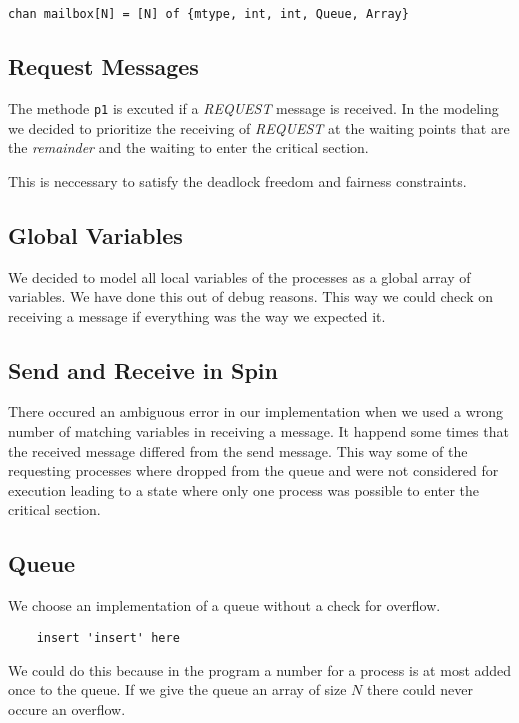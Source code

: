 \documentclass{llncs}
\begin{document}
\begin{lstlisting}
chan mailbox[N] = [N] of {mtype, int, int, Queue, Array}
\end{lstlisting}

\subsection{Request Messages}

The methode \lstinline|p1| is excuted if a \emph{REQUEST} message is received.
In the modeling we decided to prioritize the receiving of \emph{REQUEST} at the
waiting points that are the \emph{remainder} and the waiting to enter the critical section.

This is neccessary to satisfy the deadlock freedom and fairness constraints.

\subsection{Global Variables}

We decided to model all local variables of the processes as a global array of variables.
We have done this out of debug reasons. This way we could check on receiving a message
if everything was the way we expected it.

\subsection{Send and Receive in Spin}

There occured an ambiguous error in our implementation when we used a wrong number of matching
variables in receiving a message. It happend some times that the received message differed from the
send message. This way some of the requesting processes where dropped from the queue and were not considered
for execution leading to a state where only one process was possible to enter the critical section.

\subsection{Queue}

We choose an implementation of a queue without a check for overflow.
\begin{lstlisting}
    insert 'insert' here
\end{lstlisting}
We could do this because in the program a number for a process is at most added once to the queue.
If we give the queue an array of size $N$ there could never occure an overflow.
\end{document}
